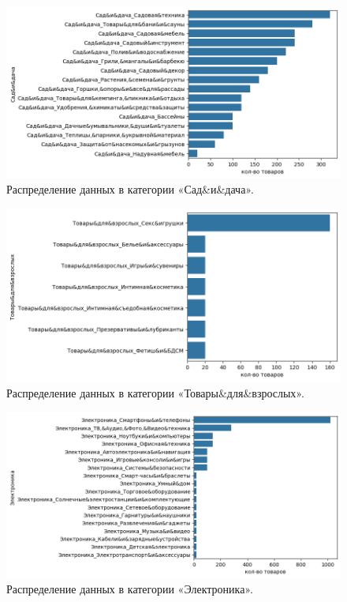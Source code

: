 \documentclass[a4paper,12pt]{extarticle}
\begin{document}
\begin{figure}[hbtp]
	\centering
	\includegraphics[scale=0.8]{приложения/amount_of_category_Сад&и&дача.png}
	\caption{Распределение данных в категории «Сад\&и\&дача».}
	\label{fig:amount_of_category_Сад&и&дача}
\end{figure}

\begin{figure}[hbtp]
	\centering
	\includegraphics[scale=0.8]{приложения/amount_of_category_Товары&для&взрослых.png}
	\caption{Распределение данных в категории «Товары\&для\&взрослых».}
	\label{fig:amount_of_category_Товары&для&взрослых}
\end{figure}

\begin{figure}[hbtp]
	\centering
	\includegraphics[scale=0.8]{приложения/amount_of_category_Электроника.png}
	\caption{Распределение данных в категории «Электроника».}
	\label{fig:amount_of_category_Электроника}
\end{figure}
\end{document}
